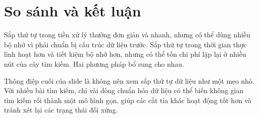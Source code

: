 \documentclass[11pt]{article}
\begin{document}
\section{So sánh và kết luận}

Sắp thứ tự trong tiền xử lý thường đơn giản và nhanh, nhưng có thể dùng nhiều
bộ nhớ vì phải chuẩn bị cấu trúc dữ liệu trước. Sắp thứ tự trong thời gian
thực linh hoạt hơn và tiết kiệm bộ nhớ hơn, nhưng có thể tốn chi phí lặp lại
ở nhiều nút của cây tìm kiếm. Hai phương pháp bổ sung cho nhau.

Thông điệp cuối của slide là không nên xem sắp thứ tự dữ liệu như một mẹo
nhỏ. Với nhiều bài tìm kiếm, chỉ vài dòng chuẩn hóa dữ liệu có thể biến không
gian tìm kiếm rối thành một mô hình gọn, giúp các cắt tỉa khác hoạt động tốt
hơn và tránh xét lại các trạng thái đối xứng.
\end{document}
